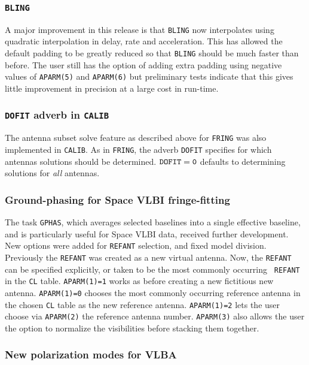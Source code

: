 \subsubsection{\tt BLING}

A major improvement in this release is that {\tt BLING} now
interpolates using quadratic interpolation in delay, rate and
acceleration.  This has allowed the default padding to be greatly
reduced so that {\tt BLING} should be much faster than before.  The
user still has the option of adding extra padding using negative
values of {\tt APARM(5)} and {\tt APARM(6)} but preliminary tests
indicate that this gives little improvement in precision at a large
cost in run-time.

\subsubsection{{\tt DOFIT} adverb in {\tt CALIB}}

The antenna subset solve feature as described above for {\tt FRING}
was also implemented in {\tt CALIB}.  As in {\tt FRING}, the adverb
{\tt DOFIT} specifies for which antennas solutions should be
determined.  $\tt DOFIT=0$ defaults to determining solutions for {\it
all} antennas.


\subsubsection{Ground-phasing for Space VLBI fringe-fitting}

The task {\tt GPHAS}, which averages selected baselines into a single
effective baseline, and is particularly useful for Space VLBI data,
received further development.  New options were added for {\tt REFANT}
selection, and fixed model division.  Previously the {\tt REFANT} was
created as a new virtual antenna.  Now, the {\tt REFANT} can be
specified explicitly, or taken to be the most commonly occurring {\tt
REFANT} in the {\tt CL} table.  {\tt APARM(1)=1} works as before
creating a new fictitious new antenna.  {\tt APARM(1)=0} chooses the
most commonly occurring reference antenna in the chosen {\tt CL} table
as the new reference antenna. {\tt APARM(1)=2} lets the user choose
via {\tt APARM(2)} the reference antenna number.  {\tt APARM(3)} also
allows the user the option to normalize the visibilities before
stacking them together.

\subsubsection{New polarization modes for VLBA}

